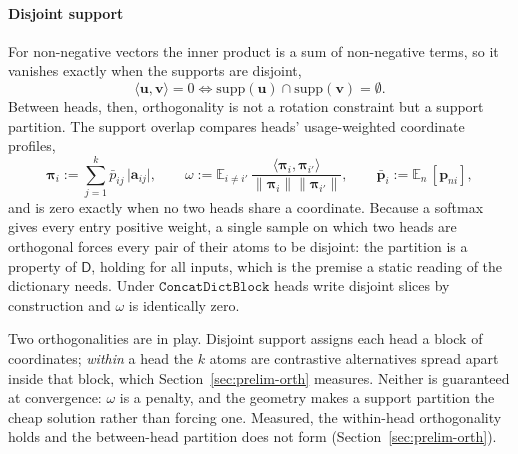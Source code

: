\paragraph{Disjoint support}
\label{sec:disjoint}
For non-negative vectors the inner product is a sum of non-negative
terms, so it vanishes exactly when the supports are disjoint,
\begin{equation}
	\langle \mathbf{u},\mathbf{v}\rangle = 0
	\iff
	\mathrm{supp}(\mathbf{u}) \cap \mathrm{supp}(\mathbf{v}) = \emptyset .
	\label{eq:disjoint}
\end{equation}
Between heads, then, orthogonality is not a rotation constraint but a
support partition. The support overlap compares heads' usage-weighted
coordinate profiles,
\begin{equation}
	\boldsymbol{\pi}_i := \sum^{k}_{j=1} \bar{p}_{ij}\,
	\lvert \mathbf{a}_{ij}\rvert,
	\qquad
	\omega := \mathbb{E}_{i \neq i'}\,
	\frac{\langle \boldsymbol{\pi}_i, \boldsymbol{\pi}_{i'}\rangle}
	     {\lVert \boldsymbol{\pi}_i\rVert \lVert \boldsymbol{\pi}_{i'}\rVert},
	\qquad
	\bar{\mathbf{p}}_i := \mathbb{E}_{n}\,[\mathbf{p}_{ni}],
	\label{eq:support}
\end{equation}
and is zero exactly when no two heads share a coordinate. Because a
softmax gives every entry positive weight, a single sample on which two
heads are orthogonal forces every pair of their atoms to be disjoint:
the partition is a property of $\mathsf{D}$, holding for all inputs,
which is the premise a static reading of the dictionary needs.
Under $\mathtt{ConcatDictBlock}$ heads write disjoint slices by
construction and $\omega$ is identically zero.

Two orthogonalities are in play. Disjoint support assigns each head a
block of coordinates; \emph{within} a head the $k$ atoms are contrastive
alternatives spread apart inside that block, which
Section~\ref{sec:prelim-orth} measures. Neither is guaranteed at
convergence: $\omega$ is a penalty, and the geometry makes a support
partition the cheap solution rather than forcing one. Measured, the
within-head orthogonality holds and the between-head partition does not
form (Section~\ref{sec:prelim-orth}).

